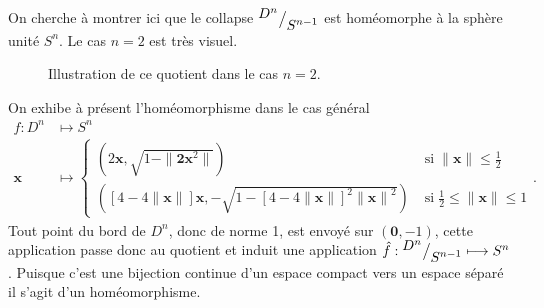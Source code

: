 \documentclass[main.tex]{subfiles}
\begin{document}
	\begin{example}
		On cherche à montrer ici que le collapse ${^{\textstyle D^n}\big/_{\textstyle S^{n-1}}}$ est homéomorphe à la sphère unité $S^n$. Le cas $n=2$ est très visuel.
		\begin{figure}[ht!]
			\centering
			\caption{Illustration de ce quotient dans le cas $n=2$.}
		\end{figure}
		On exhibe à présent l'homéomorphisme dans le cas général
		\begin{align*}
			f : D^n &\longmapsto S^n \\
			\textbf{x} &\longmapsto \begin{cases}
				(2\textbf{x},\sqrt{1-\|\textbf{2x}^2\|}) \; &\text{si} \; \|\textbf{x}\| \le \frac{1}{2} \\
				([4-4\|\textbf{x}\|]\textbf{x},-\sqrt{1-{[4-4\|\textbf{x}\|]}^2{\|\textbf{x}\|}^2}) \; &\text{si} \; \frac{1}{2} \le \|\textbf{x}\| \le 1
			\end{cases}
		.\end{align*}
		Tout point du bord de $D^n$, donc de norme 1, est envoyé sur  $(\textbf{0},-1)$, cette application passe donc au quotient et induit une application $\hat{f} : {^{\textstyle D^n}\big/_{\textstyle S^{n-1}}} \longmapsto S^n$. Puisque c'est une bijection continue d'un espace compact vers un espace séparé il s'agit d'un homéomorphisme.
	\end{example}
\end{document}
